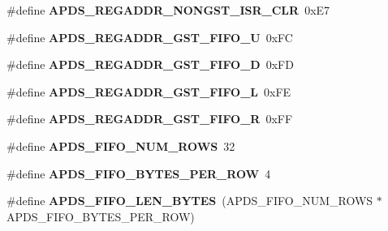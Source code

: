 \begin{DoxyCompactItemize}
\mbox{\label{group__APDS9960__FunctionDefines_gad9e36d2fa9304f24af41c4133c78afca}} 
\#define {\bfseries A\+P\+D\+S\+\_\+\+R\+E\+G\+A\+D\+D\+R\+\_\+\+N\+O\+N\+G\+S\+T\+\_\+\+I\+S\+R\+\_\+\+C\+LR}~0x\+E7
\item 
\mbox{\label{group__APDS9960__FunctionDefines_gab18f15ea93821171bd8f53d351cc51f6}} 
\#define {\bfseries A\+P\+D\+S\+\_\+\+R\+E\+G\+A\+D\+D\+R\+\_\+\+G\+S\+T\+\_\+\+F\+I\+F\+O\+\_\+U}~0x\+FC
\item 
\mbox{\label{group__APDS9960__FunctionDefines_gac2f97eff6167a735e19f30c8c52188aa}} 
\#define {\bfseries A\+P\+D\+S\+\_\+\+R\+E\+G\+A\+D\+D\+R\+\_\+\+G\+S\+T\+\_\+\+F\+I\+F\+O\+\_\+D}~0x\+FD
\item 
\mbox{\label{group__APDS9960__FunctionDefines_ga2d1363f1adda3c4674457da80375ac90}} 
\#define {\bfseries A\+P\+D\+S\+\_\+\+R\+E\+G\+A\+D\+D\+R\+\_\+\+G\+S\+T\+\_\+\+F\+I\+F\+O\+\_\+L}~0x\+FE
\item 
\mbox{\label{group__APDS9960__FunctionDefines_ga8f851d7879659f7b802b05bf0d606c57}} 
\#define {\bfseries A\+P\+D\+S\+\_\+\+R\+E\+G\+A\+D\+D\+R\+\_\+\+G\+S\+T\+\_\+\+F\+I\+F\+O\+\_\+R}~0x\+FF
\item 
\mbox{\label{group__APDS9960__FunctionDefines_ga4d73741f0e239b1aaff3aa14202978cb}} 
\#define {\bfseries A\+P\+D\+S\+\_\+\+F\+I\+F\+O\+\_\+\+N\+U\+M\+\_\+\+R\+O\+WS}~32
\item 
\mbox{\label{group__APDS9960__FunctionDefines_ga4b0c7d528308159aa51efe54cba546aa}} 
\#define {\bfseries A\+P\+D\+S\+\_\+\+F\+I\+F\+O\+\_\+\+B\+Y\+T\+E\+S\+\_\+\+P\+E\+R\+\_\+\+R\+OW}~4
\item 
\mbox{\label{group__APDS9960__FunctionDefines_ga8ee58eca95e318a6de809458fb23cf44}} 
\#define {\bfseries A\+P\+D\+S\+\_\+\+F\+I\+F\+O\+\_\+\+L\+E\+N\+\_\+\+B\+Y\+T\+ES}~(A\+P\+D\+S\+\_\+\+F\+I\+F\+O\+\_\+\+N\+U\+M\+\_\+\+R\+O\+WS $\ast$ A\+P\+D\+S\+\_\+\+F\+I\+F\+O\+\_\+\+B\+Y\+T\+E\+S\+\_\+\+P\+E\+R\+\_\+\+R\+OW)

\end{DoxyCompactItemize}
